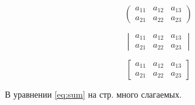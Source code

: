 \documentclass[a4paper,12pt]{article}
\begin{document}
\[
	\begin{pmatrix}
		a_{11} & a_{12} & a_{13} \\
		a_{21} & a_{22} & a_{23}
	\end{pmatrix}
\]

\[
	\begin{vmatrix}
		a_{11} & a_{12} & a_{13} \\
		a_{21} & a_{22} & a_{23}
	\end{vmatrix}
\]

\[
	\begin{bmatrix}
		a_{11} & a_{12} & a_{13} \\
		a_{21} & a_{22} & a_{23}
	\end{bmatrix}
\]

В уравнении \eqref{eq:sum} на стр. \pageref{eq:sum} много слагаемых.
\end{document}
